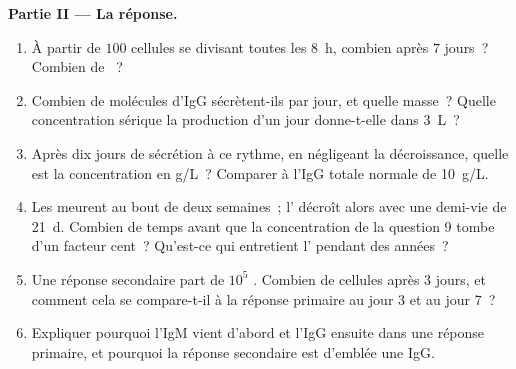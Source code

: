 \begin{problem}
\medskip
\noindent\textbf{Partie II --- La réponse.}
\begin{enumerate}[resume]
  \item À partir de $100$ cellules se divisant toutes les \qty{8}{h},
        combien après $7$ jours~? Combien de ~?
  \item Combien de molécules d'IgG sécrètent-ils par jour, et quelle
        masse~? Quelle concentration sérique la production d'un jour
        donne-t-elle dans \qty{3}{L}~?
  \item Après dix jours de sécrétion à ce rythme, en négligeant la
        décroissance, quelle est la concentration en g/L~? Comparer à
        l'IgG totale normale de \qty{10}{g/L}.
  \item Les  meurent au bout de deux semaines~; l'
        décroît alors avec une demi-vie de \qty{21}{d}. Combien de temps
        avant que la concentration de la question 9 tombe d'un facteur
        cent~? Qu'est-ce qui entretient l' pendant des années~?
  \item Une réponse secondaire part de $10^{5}$ .
        Combien de cellules après $3$ jours, et comment cela se
        compare-t-il à la réponse primaire au jour 3 et au jour 7~?
  \item Expliquer pourquoi l'IgM vient d'abord et l'IgG ensuite dans une
        réponse primaire, et pourquoi la réponse secondaire est d'emblée
        une IgG.
\end{enumerate}


\end{problem}
